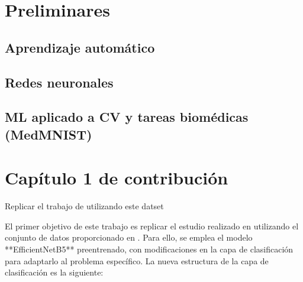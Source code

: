 \documentclass[11pt,spanish,listoffigures,listoftables]{tfgetsinf}
\begin{document}

\chapter{Preliminares}  %

\section{Aprendizaje automático}     %

\section{Redes neuronales}           %

\section{ML aplicado a CV y tareas biomédicas (MedMNIST)} %


\chapter{Capítulo 1 de contribución}  %

Replicar el trabajo de \cite{10863523} utilizando este datset \cite{chen2018knee}

El primer objetivo de este trabajo es replicar el estudio realizado en \cite{10863523} utilizando el conjunto de datos proporcionado en \cite{chen2018knee}. Para ello, se emplea el modelo **EfficientNetB5** preentrenado, con modificaciones en la capa de clasificación para adaptarlo al problema específico. La nueva estructura de la capa de clasificación es la siguiente:
\end{document}
